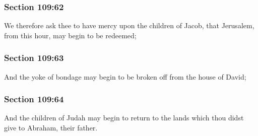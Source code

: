 	\subsubsection{Section 109:62} %
		\label{DC109-62}

		We therefore ask thee to have mercy upon the children of Jacob, that Jerusalem, from this hour, may begin to be redeemed;


	\subsubsection{Section 109:63} %
		\label{DC109-63}

		And the yoke of bondage may begin to be broken off from the house of David;


	\subsubsection{Section 109:64} %
		\label{DC109-64}

		And the children of Judah may begin to return to the lands which thou didst give to Abraham, their father.


